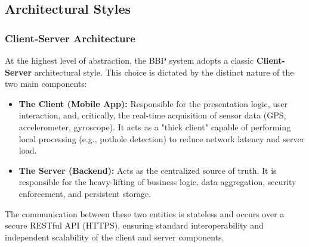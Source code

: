 \subsection{Architectural Styles}

\subsubsection{Client-Server Architecture}
At the highest level of abstraction, the BBP system adopts a classic \textbf{Client-Server} architectural style. This choice is dictated by the distinct nature of the two main components:
\begin{itemize}
    \item \textbf{The Client (Mobile App):} Responsible for the presentation logic, user interaction, and, critically, the real-time acquisition of sensor data (GPS, accelerometer, gyroscope). It acts as a "thick client" capable of performing local processing (e.g., pothole detection) to reduce network latency and server load.
    \item \textbf{The Server (Backend):} Acts as the centralized source of truth. It is responsible for the heavy-lifting of business logic, data aggregation, security enforcement, and persistent storage.
\end{itemize}
The communication between these two entities is stateless and occurs over a secure RESTful API (HTTPS), ensuring standard interoperability and independent scalability of the client and server components.

